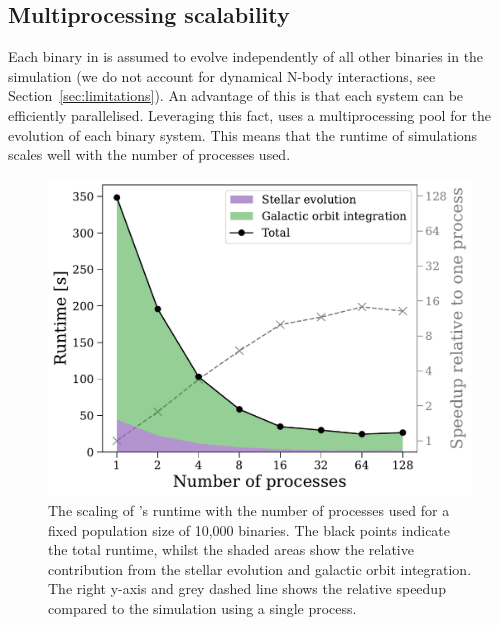 \documentclass[twocolumn, twocolappendix, oneside]{aastex631}
\begin{document}
\subsection{Multiprocessing scalability}\label{sec:runtime}

Each binary in \cogsworth is assumed to evolve independently of all other binaries in the simulation (we do not account for dynamical N-body interactions, see Section~\ref{sec:limitations}). An advantage of this is that each system can be efficiently parallelised. Leveraging this fact, \cogsworth uses a multiprocessing pool for the evolution of each binary system. This means that the runtime of simulations scales well with the number of processes used.

\begin{figure}
    \centering
    \includegraphics[width=\columnwidth]{figures/runtime_10000.pdf}
    \caption{The scaling of \cogsworth's runtime with the number of processes used for a fixed population size of 10,000 binaries. The black points indicate the total runtime, whilst the shaded areas show the relative contribution from the stellar evolution and galactic orbit integration. The right y-axis and grey dashed line shows the relative speedup compared to the simulation using a single process.}
    \label{fig:runtime-scaling}
\end{figure}

\end{document}
